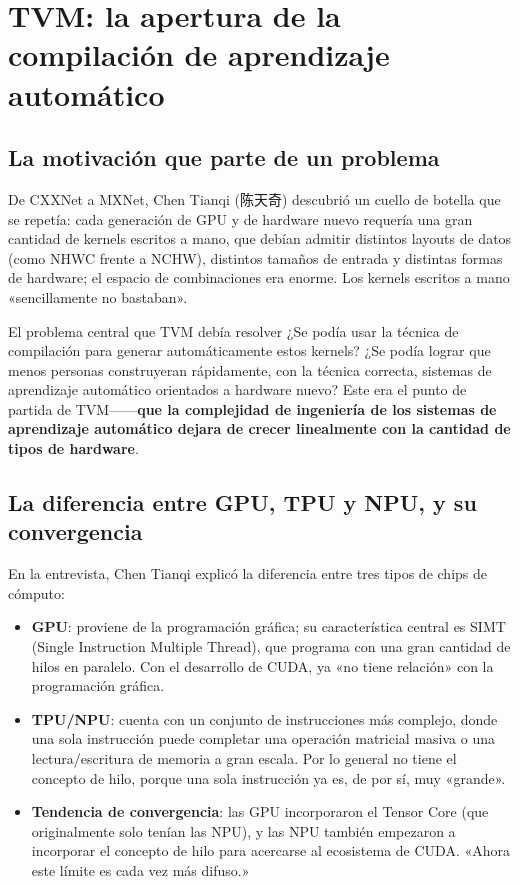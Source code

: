 \section{TVM: la apertura de la compilación de aprendizaje automático}

\subsection{La motivación que parte de un problema}

De CXXNet a MXNet, Chen Tianqi (陈天奇) descubrió un cuello de botella que se repetía: cada generación de GPU y de hardware nuevo requería una gran cantidad de kernels escritos a mano, que debían admitir distintos layouts de datos (como NHWC frente a NCHW), distintos tamaños de entrada y distintas formas de hardware; el espacio de combinaciones era enorme. Los kernels escritos a mano «sencillamente no bastaban».

\begin{importantbox}{El problema central que TVM debía resolver}
¿Se podía usar la técnica de compilación para generar automáticamente estos kernels? ¿Se podía lograr que menos personas construyeran rápidamente, con la técnica correcta, sistemas de aprendizaje automático orientados a hardware nuevo? Este era el punto de partida de TVM------\textbf{que la complejidad de ingeniería de los sistemas de aprendizaje automático dejara de crecer linealmente con la cantidad de tipos de hardware}.
\end{importantbox}

\subsection{La diferencia entre GPU, TPU y NPU, y su convergencia}

En la entrevista, Chen Tianqi explicó la diferencia entre tres tipos de chips de cómputo:

\begin{itemize}
    \item \textbf{GPU}: proviene de la programación gráfica; su característica central es SIMT (Single Instruction Multiple Thread), que programa con una gran cantidad de hilos en paralelo. Con el desarrollo de CUDA, ya «no tiene relación» con la programación gráfica.
    \item \textbf{TPU/NPU}: cuenta con un conjunto de instrucciones más complejo, donde una sola instrucción puede completar una operación matricial masiva o una lectura/escritura de memoria a gran escala. Por lo general no tiene el concepto de hilo, porque una sola instrucción ya es, de por sí, muy «grande».
    \item \textbf{Tendencia de convergencia}: las GPU incorporaron el Tensor Core (que originalmente solo tenían las NPU), y las NPU también empezaron a incorporar el concepto de hilo para acercarse al ecosistema de CUDA. «Ahora este límite es cada vez más difuso.»
\end{itemize}

